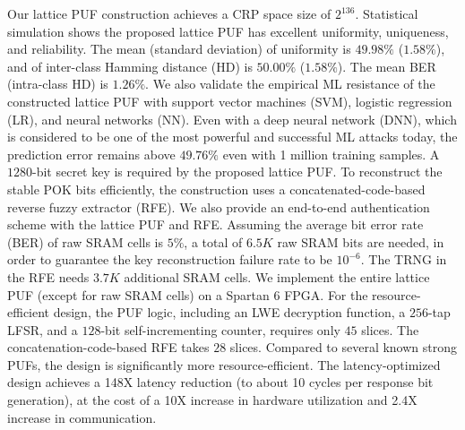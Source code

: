 Our lattice PUF construction achieves a CRP space size of $2^{136}$.
Statistical simulation shows the proposed lattice PUF has excellent uniformity, uniqueness, and reliability.
The mean (standard deviation) of uniformity is $49.98\%$ ($1.58\%$), and of inter-class Hamming distance (HD) is $50.00\%$ ($1.58\%$).
The mean BER (intra-class HD) is $1.26\%$.
We also validate the empirical ML resistance of the constructed lattice PUF with support vector machines (SVM), logistic regression (LR), and neural networks (NN). 
Even with a deep neural network (DNN), which is considered to be one of the most powerful and successful ML attacks today, the prediction error remains above $49.76\%$ even with 1 million training samples. 
A $1280$-bit secret key is required by the proposed lattice PUF.
To reconstruct the stable POK bits efficiently, the construction uses a concatenated-code-based reverse fuzzy extractor (RFE). 
We also provide an end-to-end authentication scheme with the lattice PUF and RFE.
Assuming the average bit error rate (BER) of raw SRAM cells is $5\%$, a total of $6.5K$ raw SRAM bits are needed, in order to guarantee the key reconstruction failure rate to be $10^{-6}$. 
The TRNG in the RFE needs $3.7K$ additional SRAM cells. 
We implement the entire lattice PUF (except for raw SRAM cells) on a Spartan 6 FPGA.
For the resource-efficient design, the PUF logic, including an LWE decryption function, a $256$-tap LFSR, and a $128$-bit self-incrementing counter, requires only $45$ slices. The concatenation-code-based RFE takes $28$ slices. Compared to several known strong PUFs, the design is significantly more resource-efficient. The latency-optimized design achieves a 148X latency reduction (to about 10 cycles per response bit generation), at the cost of a 10X increase in hardware utilization and 2.4X increase in communication.